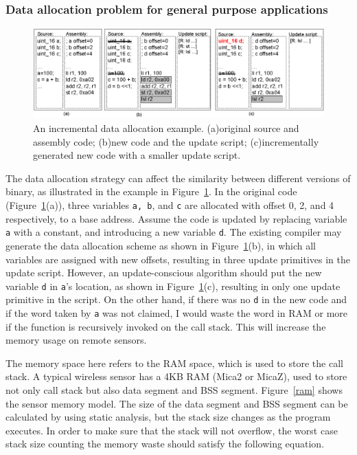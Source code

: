 \subsubsection{Data allocation problem for general purpose applications}

\begin{figure}[htbp]
\centering
\includegraphics[width=6in]{figures/fdata.0.eps}
\caption{An incremental data allocation example.
(a)original source and assembly code;
(b)new code and the update script;
(c)incrementally generated new code with a smaller update script.}
\label{fdata.0}
\end{figure}

The data allocation
strategy can affect the similarity between different versions of
binary, as illustrated in the example in Figure~\ref{fdata.0}.  In the
original code (Figure~\ref{fdata.0}(a)), three variables {\tt a, b},
and {\tt c} are allocated with offset 0, 2, and 4 respectively, to a
base address. Assume the code is updated by replacing variable {\tt a}
with a constant, and introducing a new variable {\tt d}. The existing
compiler may generate the data allocation scheme as shown in Figure~\ref{fdata.0}(b), in which all variables are assigned with new
offsets, resulting in three update primitives in the update
script. However, an update-conscious algorithm should put the new
variable {\tt d} in {\tt a}'s location, as shown in
Figure~\ref{fdata.0}(c), resulting in only one update primitive in the
script. On the other hand, if there was no {\tt d} in the new code and
if the word taken by {\tt a} was not claimed, I would waste the
word in RAM or more if the function is recursively
invoked on the call stack. This will increase the memory usage on remote sensors.


The memory space here refers to the RAM space, 
which is used to store the call stack. A typical wireless sensor has a
4KB RAM (Mica2 or MicaZ), used to store not only call stack but
also data segment and BSS segment. Figure~\ref{ram} shows the sensor memory
model. The size of the data segment and BSS segment can be calculated
by using static analysis, but the stack size changes as the program
executes. In order to make sure that the stack will not overflow,
the worst case stack size counting the memory waste should satisfy the following equation.

